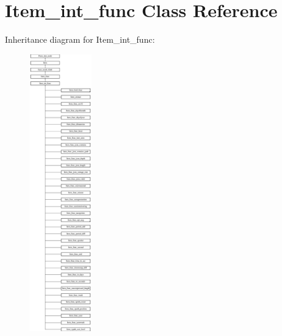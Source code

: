 \hypertarget{classItem__int__func}{}\section{Item\+\_\+int\+\_\+func Class Reference}
\label{classItem__int__func}
Inheritance diagram for Item\+\_\+int\+\_\+func\+:\begin{figure}[H]
\begin{center}
\leavevmode
\includegraphics[height=12.000000cm]{classItem__int__func}
\end{center}
\end{figure}

